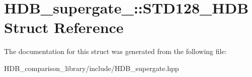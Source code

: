 \hypertarget{structHDB__supergate___1_1STD128__HDB}{}\section{H\+D\+B\+\_\+supergate\+\_\+\+:\+:S\+T\+D128\+\_\+\+H\+DB Struct Reference}
\label{structHDB__supergate___1_1STD128__HDB}


The documentation for this struct was generated from the following file\+:\begin{DoxyCompactItemize}
\item 
H\+D\+B\+\_\+comparison\+\_\+library/include/H\+D\+B\+\_\+supergate.\+hpp\end{DoxyCompactItemize}
